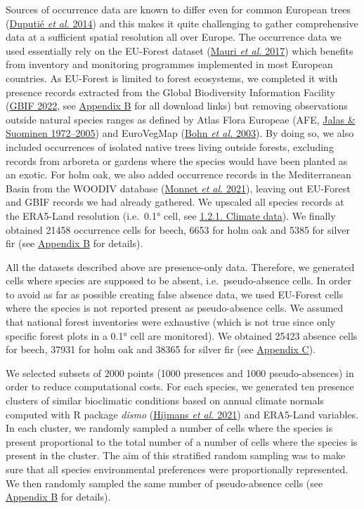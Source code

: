 \documentclass[11pt,]{article}
\begin{document}
Sources of occurrence data are known to differ even for common European
trees (\protect\hyperlink{ref-Duputie2014}{Duputié \emph{et al.} 2014})
and this makes it quite challenging to gather comprehensive data at a
sufficient spatial resolution all over Europe. The occurrence data we
used essentially rely on the EU-Forest dataset
(\protect\hyperlink{ref-Mauri2017}{Mauri \emph{et al.} 2017}) which
benefits from inventory and monitoring programmes implemented in most
European countries. As EU-Forest is limited to forest ecosystems, we
completed it with presence records extracted from the Global
Biodiversity Information Facility (\protect\hyperlink{ref-GBIF2022}{GBIF
2022}, see \protect\hyperlink{appendixB}{Appendix B} for all download
links) but removing observations outside natural species ranges as
defined by Atlas Flora Europeae (AFE,
\protect\hyperlink{ref-AFE2005}{Jalas \& Suominen 1972--2005}) and
EuroVegMap (\protect\hyperlink{ref-EVM2003}{Bohn \emph{et al.} 2003}).
By doing so, we also included occurrences of isolated native trees
living outside forests, excluding records from arboreta or gardens where
the species would have been planted as an exotic. For holm oak, we also
added occurrence records in the Mediterranean Basin from the WOODIV
database (\protect\hyperlink{ref-Monnet2021}{Monnet \emph{et al.}
2021}), leaving out EU-Forest and GBIF records we had already gathered.
We upscaled all species records at the ERA5-Land resolution (i.e.~0.1°
cell, see \protect\hyperlink{climatedata}{1.2.1. Climate data}). We
finally obtained 21458 occurrence cells for beech, 6653 for holm oak and
5385 for silver fir (see \protect\hyperlink{appendixB}{Appendix B} for
details).

All the datasets described above are presence-only data. Therefore, we
generated cells where species are supposed to be absent,
i.e.~pseudo-absence cells. In order to avoid as far as possible creating
false absence data, we used EU-Forest cells where the species is not
reported present as pseudo-absence cells. We assumed that national
forest inventories were exhaustive (which is not true since only
specific forest plots in a 0.1° cell are monitored). We obtained 25423
absence cells for beech, 37931 for holm oak and 38365 for silver fir
(see \protect\hyperlink{appendixC}{Appendix C}).

We selected subsets of 2000 points (1000 presences and 1000
pseudo-absences) in order to reduce computational costs. For each
species, we generated ten presence clusters of similar bioclimatic
conditions based on annual climate normals computed with R package
\emph{dismo} (\protect\hyperlink{ref-Hijmans2021}{Hijmans \emph{et al.}
2021}) and ERA5-Land variables. In each cluster, we randomly sampled a
number of cells where the species is present proportional to the total
number of a number of cells where the species is present in the cluster.
The aim of this stratified random sampling was to make sure that all
species environmental preferences were proportionally represented. We
then randomly sampled the same number of pseudo-absence cells (see
\protect\hyperlink{appendixB}{Appendix B} for details).
\end{document}
